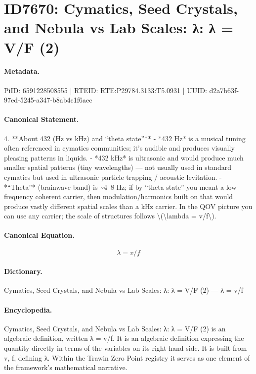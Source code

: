 \section*{ID7670: Cymatics, Seed Crystals, and Nebula vs Lab Scales: λ: λ = V/F (2)}
\paragraph{Metadata.}
PiID: 6591228508555 | RTEID: RTE:P29784.3133:T5.0931 | UUID: d2a7b63f-97ed-5245-a347-b8ab4c1f6aec

\paragraph{Canonical Statement.}
4. **About 432 (Hz vs kHz) and “theta state”** - *432 Hz* is a musical tuning often referenced in cymatics communities; it’s audible and produces visually pleasing patterns in liquids. - *432 kHz* is ultrasonic and would produce much smaller spatial patterns (tiny wavelengths) — not usually used in standard cymatics but used in ultrasonic particle trapping / acoustic levitation. - *“Theta”* (brainwave band) is \textasciitilde{}4–8 Hz; if by “theta state” you meant a low-frequency coherent carrier, then modulation/harmonics built on that would produce vastly different spatial scales than a kHz carrier. In the QOV picture you can use any carrier; the scale of structures follows \textbackslash{}(\textbackslash{}lambda = v/f\textbackslash{}).

\paragraph{Canonical Equation.}
\[
\lambda = v/f
\]

\paragraph{Dictionary.}
Cymatics, Seed Crystals, and Nebula vs Lab Scales: λ: λ = V/F (2) — λ = v/f

\paragraph{Encyclopedia.}
Cymatics, Seed Crystals, and Nebula vs Lab Scales: λ: λ = V/F (2) is an algebraic definition, written λ = v/f. It is an algebraic definition expressing the quantity directly in terms of the variables on its right-hand side. It is built from v, f, defining λ. Within the Trawin Zero Point registry it serves as one element of the framework's mathematical narrative.
